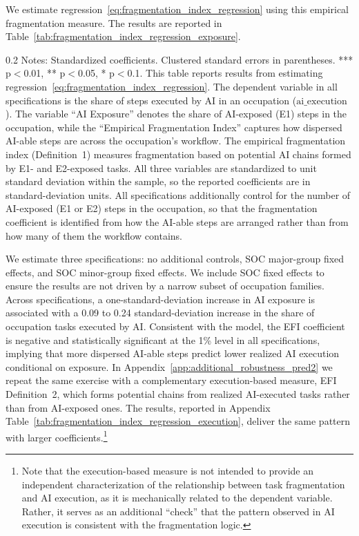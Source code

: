 We estimate regression~\eqref{eq:fragmentation_index_regression} using this empirical fragmentation measure.
The results are reported in Table~\ref{tab:fragmentation_index_regression_exposure}.
\begin{table}[!t]
    \caption{Role of AI-able Task Fragmentation in Determining AI Execution Outcomes}
    \label{tab:fragmentation_index_regression_exposure}
    \footnotesize
    \centering
    
    \begin{minipage}{1\linewidth}
\begin{spacing}{0.2}
{\fontsize{9.5pt}{10pt}\selectfont Notes: Standardized coefficients. Clustered standard errors in parentheses. *** p$<$0.01, ** p$<$0.05, * p$<$0.1.
This table reports results from estimating regression~\eqref{eq:fragmentation_index_regression}.
The dependent variable in all specifications is the share of steps executed by AI in an occupation ($\text{ai\_execution}$).
The variable ``AI Exposure'' denotes the share of AI-exposed (E1) steps in the occupation, while the ``Empirical Fragmentation Index'' captures how dispersed AI-able steps are across the occupation's workflow.
The empirical fragmentation index (Definition~1) measures fragmentation based on potential AI chains formed by E1- and E2-exposed tasks.
All three variables are standardized to unit standard deviation within the sample, so the reported coefficients are in standard-deviation units. All specifications additionally control for the number of AI-exposed (E1 or E2) steps in the occupation, so that the fragmentation coefficient is identified from how the AI-able steps are arranged rather than from how many of them the workflow contains.}
\end{spacing}
\end{minipage}\end{table}
We estimate three specifications: no additional controls, SOC major-group fixed effects, and SOC minor-group fixed effects.
We include SOC fixed effects to ensure the results are not driven by a narrow subset of occupation families.
Across specifications, a one-standard-deviation increase in AI exposure is associated with a 0.09 to 0.24 standard-deviation increase in the share of occupation tasks executed by AI.
Consistent with the model, the EFI coefficient is negative and statistically significant at the 1\% level in all specifications, implying that more dispersed AI-able steps predict lower realized AI execution conditional on exposure.
In Appendix~\ref{app:additional_robustness_pred2} we repeat the same exercise with a complementary execution-based measure, EFI Definition~2, which forms potential chains from realized AI-executed tasks rather than from AI-exposed ones.
The results, reported in Appendix Table~\ref{tab:fragmentation_index_regression_execution}, deliver the same pattern with larger coefficients.\footnote{Note that the execution-based measure is not intended to provide an independent characterization of the relationship between task fragmentation and AI execution, as it is mechanically related to the dependent variable. Rather, it serves as an additional ``check'' that the pattern observed in AI execution is consistent with the fragmentation logic.}

